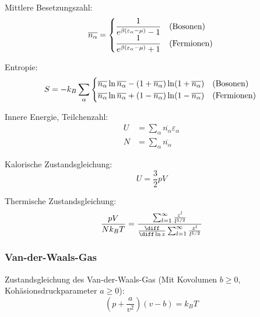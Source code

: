 \documentclass[11pt]{article}
\numberwithin{equation}{section}
\begin{document}
        Mittlere Besetzungszahl:
        \begin{equation}
          \overline{n_\alpha} =
              \begin{cases}
                \dfrac{1}{e^{\beta(\varepsilon_\alpha-\mu)} - 1} & \text{(Bosonen)} \\
                \dfrac{1}{e^{\beta(\varepsilon_\alpha-\mu)} + 1} & \text{(Fermionen)}
              \end{cases} \\
        \end{equation}

        Entropie:
        \begin{equation}
          S= -k_B\sum_\alpha
            \begin{cases}
              \overline{n_\alpha} \ln \overline{n_\alpha} - (1+\overline{n_\alpha}) \ln (1+\overline{n_\alpha}) & \text{(Bosonen)} \\
              \overline{n_\alpha} \ln \overline{n_\alpha} + (1-\overline{n_\alpha}) \ln (1-\overline{n_\alpha}) & \text{(Fermionen)}
            \end{cases} \\
        \end{equation}

        Innere Energie, Teilchenzahl:
        \begin{equation}
          \begin{aligned}
            U &= \sum_\alpha \overline{n_\alpha} \varepsilon_\alpha \\
            N &= \sum_\alpha \overline{n_\alpha}
          \end{aligned}
        \end{equation}

        Kalorische Zustandsgleichung:
        \begin{equation}
          U=\frac{3}{2}pV
        \end{equation}

        Thermische Zustandsgleichung:
        \begin{equation}
          \frac{pV}{N k_B T} = \frac{\sum_{l=1}^{\infty}\frac{z^l}{l^{5/2}}}{\tder{}{\ln z}\sum_{l=1}^{\infty}\frac{z^l}{l^{5/2}}}
        \end{equation}

      \subsubsection{Van-der-Waals-Gas}
        Zustandsgleichung des Van-der-Waals-Gas (Mit Kovolumen $b \ge 0$, Kohäsionsdruckparameter $a \ge 0$):
        \begin{equation}
          \left( p+\frac{a}{v^2} \right) \left( v-b \right) = k_B T
        \end{equation}
\end{document}
